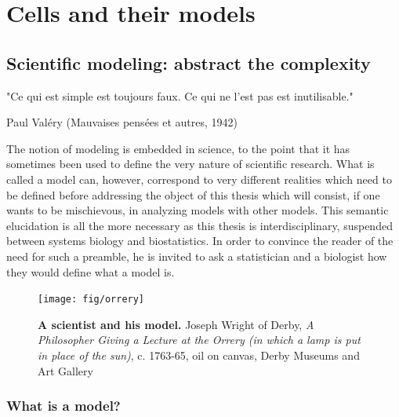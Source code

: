 \documentclass[a4paper,12pt,twoside,onecolumn,openright,final,oldfontcommands]{memoir}
\newcommand{\initial}[1]{
	\lettrine[lines=3,lhang=0.33,nindent=0em]{
		\color{gray}
     		{\textsc{#1}}}{}}
\newcommand\blankpage{%
    \null
    \thispagestyle{empty}%
    \newpage
    }
\begin{document}
\listoffigures
{}
\newpage

\blankpage


\part{Cells and their
models}\label{part-cells-and-their-models}

\chapter{Scientific modeling: abstract the
complexity}\label{scientific-modeling-abstract-the-complexity}

\epigraph{"Ce qui est simple est toujours faux. Ce qui ne l'est pas est inutilisable."}{Paul Valéry (Mauvaises pensées et autres, 1942)}

\initial{T}he notion of modeling is embedded in science, to the point
that it has sometimes been used to define the very nature of scientific
research. What is called a model can, however, correspond to very
different realities which need to be defined before addressing the
object of this thesis which will consist, if one wants to be
mischievous, in analyzing models with other models. This semantic
elucidation is all the more necessary as this thesis is
interdisciplinary, suspended between systems biology and biostatistics.
In order to convince the reader of the need for such a preamble, he is
invited to ask a statistician and a biologist how they would define what
a model is.

\begin{figure}

{\centering \texttt{[image: fig/orrery]} 

}

\caption[A scientist and his model]{\textbf{A scientist and his model.} Joseph Wright
of Derby, \emph{A Philosopher Giving a Lecture at the Orrery (in which a
lamp is put in place of the sun)}, c. 1763-65, oil on canvas, Derby
Museums and Art Gallery}\label{fig:orrery}
\end{figure}






\section{What is a model?}\label{what-is-a-model}
\end{document}
